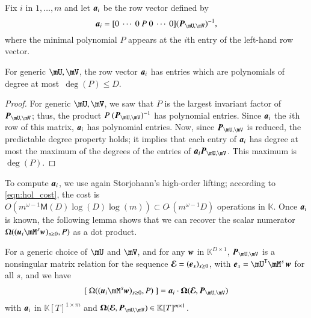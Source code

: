 \documentclass[final,1p,times,authoryear]{elsarticle}
\newcommand{\var}{T} %
\newcommand{\mat}[1]{\bm{\MakeUppercase{#1}}} %
\newcommand{\row}[1]{\bm{\MakeLowercase{#1}}} %
\newcommand{\col}[1]{\bm{\MakeLowercase{#1}}} %
\newcommand{\softO}[1]{O{\tilde{~}}(#1)} %
\newcommand{\minpoly}{P}
\newcommand{\trsp}[1]{#1^{\mathsf{T}}} %
\def\M {\ensuremath{\mathsf{M}}}
\def\K{\mathbb{K}}
\def\K {\ensuremath{\mathbb{K}}}
\newcommand{\mUt}{\trsp{\mU}}
\begin{document}
Fix $i$ in $1,\dots,m$ and let $\row{a}_i$ be the row vector defined
by $$\row{a}_i =[0~\cdots~0~\minpoly~0~\cdots~0]  (\mat{P}_{\mU,\mV})^{-1} ,$$
where the minimal polynomial $\minpoly$ appears at the $i$th entry  of the
left-hand row vector. 
\begin{lemma}\label{utilde}
  For generic $\mU,\mV$, the row vector $\row{a}_i$ has entries which are
  polynomials of degree at most~$\deg(P) \le D$.
\end{lemma}
\begin{proof}
  For generic $\mU,\mV$, we saw that $\minpoly$ is the largest invariant factor
  of $ \mat{P}_{\mU,\mV}$; thus, the product $\minpoly\
  (\mat{P}_{\mU,\mV})^{-1}$ has polynomial entries. Since $\row{a}_i$ the $i$th
  row of this matrix, $\row{a}_i$ has polynomial entries.  Now, since
  $\mat{P}_{\mU,\mV}$ is reduced, the predictable degree property
  \citep[Theorem~6.3-13]{Kailath80} holds; it implies that each entry of
  $\row{a}_i$ has degree at most the maximum of the degrees of the entries of
  $\row{a}_i\mat{P}_{\mU,\mV}$. This maximum is $\deg(\minpoly)$.
\end{proof}
To compute $\row{a}_i$, we use again Storjohann's high-order lifting;
according to \cref{eqn:hol_cost}, the cost is $ O(m^{\omega-1} \M(D)
\log(D) \log(m)) \subset \softO{m^{\omega-1}D}$ operations in $\K$.
Once $\row{a}_i$ is known, the following lemma shows that we can
recover the scalar numerator $\Omega((\row{u}_i \mM^s \col{w})_{s \ge
0}, \minpoly)$ as a dot product.
\begin{lemma}\label{lemma:omegaOmega}
  For a generic choice of $\mU$ and $\mV$, and for any $\col{w}$ in
  $\K^{D \times 1}$, $ \mat{P}_{\mU,\mV}$ is a nonsingular matrix
  relation for the sequence $\mat{\mathcal{E}} =
  (\col{e}_s)_{s\ge0}$, with $\col{e}_s=\mUt \mM^s\, \col{w}$
  for all $s$, and we have
  \begin{align}\label{eq:OmegaOmega}
    [~\Omega((\row{u}_i \mM^s \col{w})_{s \ge 0}, \minpoly)~] = \row{a}_i\cdot \mat{\Omega}(\mat{\mathcal{E}}, \mat{P}_{\mU,\mV})
  \end{align}
  with $\row{a}_i$ in $\K[\var]^{1 \times m}$ and 
  $\mat{\Omega}(\mat{\mathcal{E}} , \mat{P}_{\mU,\mV}) \in \K[\var]^{m \times 1}$.
\end{lemma}
\end{document}
